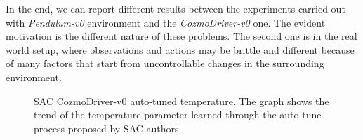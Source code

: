 In the end, we can report different results between the experiments carried out with \textit{Pendulum-v0} environment and the \textit{CozmoDriver-v0} one.
The evident motivation is the different nature of these problems.
The second one is in the real world setup, where observations and actions may be brittle and different because of many factors that start from uncontrollable changes in the surrounding environment.

%
%

\begin{figure}[!h]
	\centering
	\caption[SAC CozmoDriver-v0 auto-tuned temperature]{SAC CozmoDriver-v0 auto-tuned temperature.
		The graph shows the trend of the temperature parameter learned through the auto-tune process proposed by SAC authors.}
	\label{fig:sac_cozmo_temperature}
\end{figure}


%
%

